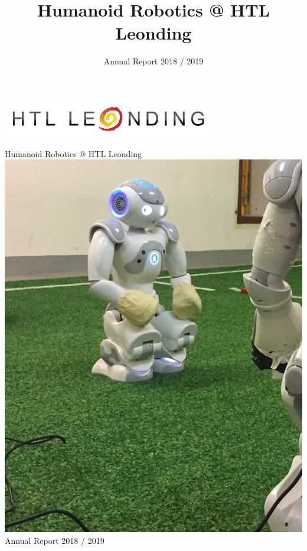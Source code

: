 \documentclass[11pt]{article}
\title{Humanoid Robotics @ HTL Leonding}
\author{Annual Report 2018 / 2019}
\begin{document}
\begin{titlepage}
\begin{flushright}
\includegraphics[scale=.85]{../img/htlleondinglogo.png}\\
\end{flushright}

\vspace{2em}

\begin{center}
{\Huge Humanoid Robotics @ HTL Leonding} \\[2em]
\includegraphics[scale=0.55]{img/Titlepage.png}\\[2em]
{\LARGE Annual Report 2018 / 2019}
\end{center}
\end{titlepage}

\tableofcontents
\newpage
\end{document}
